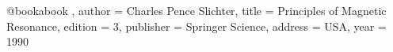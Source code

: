 @book{abook ,
author = {Charles Pence Slichter},
title = {Principles of Magnetic Resonance},
edition = {3},
publisher = {Springer Science},
address = {USA},
year = {1990}
}
